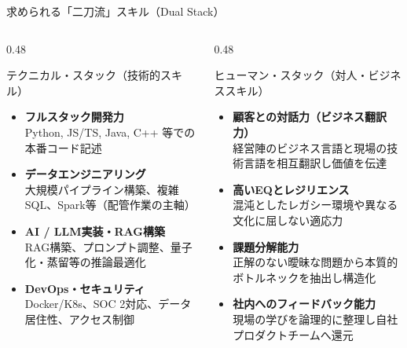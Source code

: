 \documentclass[aspectratio=169,11pt]{beamer}
\begin{document}
\begin{frame}{求められる「二刀流」スキル（Dual Stack）}
  \begin{columns}[T]
    \begin{column}{0.48\textwidth}
      \begin{block}{テクニカル・スタック（技術的スキル）}
        \scriptsize
        \begin{itemize}\setlength{\itemsep}{3pt}
          \item \textbf{フルスタック開発力}\\
            Python, JS/TS, Java, C++ 等での本番コード記述
          \item \textbf{データエンジニアリング}\\
            大規模パイプライン構築、複雑SQL、Spark等（配管作業の主軸）
          \item \textbf{AI / LLM実装・RAG構築}\\
            RAG構築、プロンプト調整、量子化・蒸留等の推論最適化
          \item \textbf{DevOps・セキュリティ}\\
            Docker/K8s、SOC 2対応、データ居住性、アクセス制御
        \end{itemize}
      \end{block}
    \end{column}
    \begin{column}{0.48\textwidth}
      \begin{exampleblock}{ヒューマン・スタック（対人・ビジネススキル）}
        \scriptsize
        \begin{itemize}\setlength{\itemsep}{3pt}
          \item \textbf{顧客との対話力（ビジネス翻訳力）}\\
            経営陣のビジネス言語と現場の技術言語を相互翻訳し価値を伝達
          \item \textbf{高いEQとレジリエンス}\\
            混沌としたレガシー環境や異なる文化に屈しない適応力
          \item \textbf{課題分解能力}\\
            正解のない曖昧な問題から本質的ボトルネックを抽出し構造化
          \item \textbf{社内へのフィードバック能力}\\
            現場の学びを論理的に整理し自社プロダクトチームへ還元
        \end{itemize}
      \end{exampleblock}
    \end{column}
  \end{columns}
\end{frame}
\end{document}
